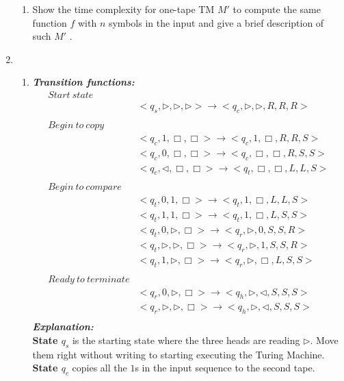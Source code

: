 \documentclass[12pt,a4paper]{article}
\makeatletter
\newtheorem*{solution}{Solution}
\theoremstyle{definition}
\renewenvironment{solution}[1][Solution] {\par\pushQED{\qed}\normalfont\topsep6\p@\@plus6\p@\relax\trivlist\item[\hskip\labelsep\bfseries#1\@addpunct{.}]\ignorespaces}{\popQED\endtrivlist\@endpefalse} \makeatother
\makeatother
\begin{document}
\begin{enumerate}
\begin{enumerate}
	    \item 
	    Show the time complexity for one-tape TM $M'$ to compute the same function $f$ with $n$ symbols in the input and give a brief description of such $M'$ .
	
	\end{enumerate}
	\begin{solution}
	~\\
	\begin{enumerate}
	\item \textbf{\textit{Transition functions:}}
	\begin{align*}\nonumber
	Start\ state\\
	&<q_s,\triangleright,\triangleright,\triangleright>\rightarrow <q_c,\triangleright,\triangleright,R,R,R>\\
	~\\
	Begin\ to\ copy\\
	&<q_c,1,\Box,\Box>\rightarrow <q_c,1,\Box,R,R,S>\\
	&<q_c,0,\Box,\Box>\rightarrow <q_c,\Box,\Box,R,S,S>\\
	&<q_c,\triangleleft,\Box,\Box>\rightarrow <q_t,\Box,\Box,L,L,S>\\	
	~\\	
	Begin\ to\ compare\\
	&<q_t,0,1,\Box>\rightarrow <q_t,1,\Box,L,L,S>\\
	&<q_t,1,1,\Box>\rightarrow <q_t,1,\Box,L,S,S>\\
	&<q_t,0,\triangleright,\Box>\rightarrow <q_r,\triangleright,0,S,S,R>\\
	&<q_t,\triangleright,\triangleright,\Box>\rightarrow <q_r,\triangleright,1,S,S,R>\\
	&<q_t,1,\triangleright,\Box>\rightarrow <q_r,\triangleright,\Box,L,S,S>\\
	~\\
	Ready\ to\ terminate\\
	&<q_r,0,\triangleright,\Box>\rightarrow <q_h,\triangleright,\triangleleft,S,S,S>\\
	&<q_r,\triangleright,\triangleright,\Box>\rightarrow <q_h,\triangleright,\triangleleft,S,S,S>\\
	\end{align*}
	\textbf{\textit{Explanation:}}
	\\
	\textbf{State $q_s$} is the starting state where the three heads are reading $\triangleright$. Move them right without writing to starting executing the Turing Machine.
	\\
	\textbf{State $q_c$} copies all the $1$s in the input sequence to the second tape.

\end{enumerate}
\end{solution}
\end{enumerate}
\end{document}
